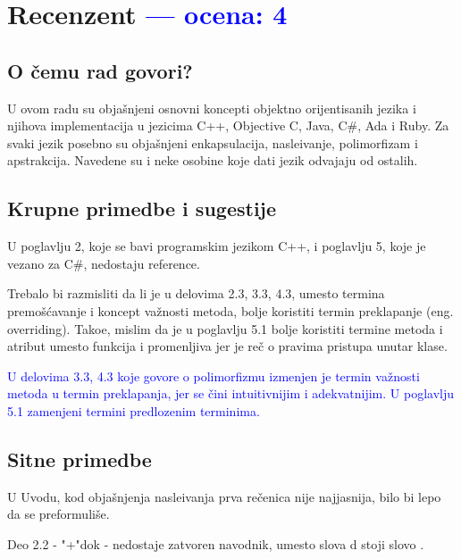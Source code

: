 \documentclass[a4paper]{report}
\newcommand{\odgovor}[1]{\textcolor{blue}{#1}}
\begin{document}
\chapter{Recenzent \odgovor{--- ocena: 4} }


\section{O čemu rad govori?}
U ovom radu su obja\v snjeni osnovni koncepti objektno orijentisanih jezika i njihova implementacija u jezicima C++, Objective C, Java, C\#, Ada i Ruby.
Za svaki jezik posebno su obja\v snjeni enkapsulacija, nasle\dj{}ivanje, polimorfizam i apstrakcija. Navedene su i neke osobine koje dati jezik odvajaju od ostalih.
\section{Krupne primedbe i sugestije}
U poglavlju 2, koje se bavi programskim jezikom C++, i poglavlju 5, koje je vezano za C\#, nedostaju reference. 

Trebalo bi razmisliti da li je u delovima 2.3, 3.3, 4.3,  umesto termina premo\v s\'cavanje i koncept va\v znosti metoda, bolje koristiti termin preklapanje (eng. overriding). Tako\dj{}e, mislim da je u poglavlju 5.1 bolje koristiti termine metoda i atribut  umesto funkcija i promenljiva jer je re\v c o pravima pristupa unutar klase.

\odgovor{
U delovima 3.3, 4.3 koje govore o polimorfizmu izmenjen je termin važnosti metoda u termin preklapanja, jer se čini intuitivnijim i adekvatnijim. U poglavlju 5.1 zamenjeni termini predlozenim terminima.}

\section{Sitne primedbe}
U Uvodu, kod obja\v snjenja nasle\dj{}ivanja prva re\v cenica nije najjasnija, bilo bi lepo da se preformuli\v se.

Deo 2.2 - "+"dok - nedostaje zatvoren navodnik, umesto slova d stoji slovo \dj{}.
\end{document}
